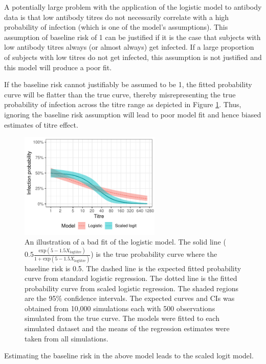 A potentially large problem with the application of the logistic model to antibody data is that low antibody titres do not necessarily correlate with a high probability of infection (which is one of the model's assumptions). This assumption of baseline risk of 1 can be justified if it is the case that subjects with low antibody titres always (or almost always) get infected. If a large proportion of subjects with low titres do not get infected, this assumption is not justified and this model will produce a poor fit. 

If the baseline risk cannot justifiably be assumed to be 1, the fitted probability curve will be flatter than the true curve, thereby misrepresenting the true probability of infection across the titre range as depicted in Figure \ref{LogisticFit}. Thus, ignoring the baseline risk assumption will lead to poor model fit and hence biased estimates of titre effect.

\begin{figure}[htp]
	\centering
	\includegraphics[width=0.6\textwidth]{../logistic-plot/predsplot.pdf}
	\caption{
	An illustration of a bad fit of the logistic model. The solid line ($0.5\frac{\text{exp}(5 - 1.5 X_{\text{logtitre}})}{1 + \text{exp}(5 - 1.5 X_{\text{logtitre}})}$) is the true probability curve where the baseline risk is 0.5. The dashed line is the expected fitted probability curve from standard logistic regression. The dotted line is the fitted probability curve from scaled logistic regression. The shaded regions are the 95\% confidence intervals. The expected curves and CIs was obtained from 10,000 simulations each with 500 observations simulated from the true curve. The models were fitted to each simulated dataset and the means of the regression estimates were taken from all simulations.
}
	\label{LogisticFit}
\end{figure}

Estimating the baseline risk in the above model leads to the scaled logit model.
